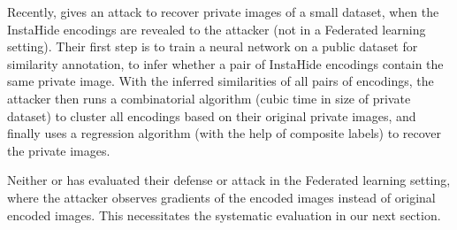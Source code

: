 Recently, \citep{carlini2020attack} gives an attack to recover private images of a small dataset, when the InstaHide encodings are revealed to the attacker (not in a Federated learning setting). Their first step is to train a neural network on a public dataset for similarity annotation, 
to infer whether a pair of InstaHide encodings contain the same private image. With the inferred similarities of all pairs of encodings, the attacker then runs a combinatorial algorithm (cubic time in size of private dataset) to cluster all encodings based on their original private images, and finally uses a regression algorithm (with the help of composite labels) to recover the private images. 

Neither \citep{huang2020instahide} or \citep{carlini2020attack} has evaluated their defense or attack in the Federated learning setting, where the attacker observes gradients of the encoded images instead of original encoded images. This necessitates the systematic evaluation in our next section. 